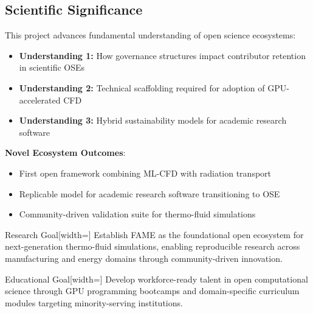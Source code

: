 \documentclass[11pt]{article}
\begin{document}
\subsection{Scientific Significance}
This project advances fundamental understanding of open science ecosystems:

\vspace{-10pt}
\begin{itemize}[label=\textbullet, align=left, labelwidth=4em, labelsep=1em, leftmargin=*,noitemsep]
    \item \textbf{Understanding 1:} How governance structures impact contributor retention in scientific OSEs
    \item \textbf{Understanding 2:} Technical scaffolding required for adoption of GPU-accelerated CFD
    \item \textbf{Understanding 3:} Hybrid sustainability models for academic research software
\end{itemize}

\vspace{-10pt}
\noindent
\textbf{Novel Ecosystem Outcomes}:
\begin{itemize}[label=\textbullet, align=left, labelwidth=4em, labelsep=1em, leftmargin=*,noitemsep]
    \item First open framework combining ML-CFD with radiation transport
    \item Replicable model for academic research software transitioning to OSE
    \item Community-driven validation suite for thermo-fluid simulations
\end{itemize}

\begin{dashtcb}[FlyersBlue]{Research Goal}[width=\linewidth]
Establish FAME as the foundational open ecosystem for next-generation thermo-fluid simulations, enabling reproducible research across manufacturing and energy domains through community-driven innovation.
\end{dashtcb}

\begin{dashtcb}[FlyersRed]{Educational Goal}[width=\linewidth]
Develop workforce-ready talent in open computational science through GPU programming bootcamps and domain-specific curriculum modules targeting minority-serving institutions.
\end{dashtcb}
\end{document}
